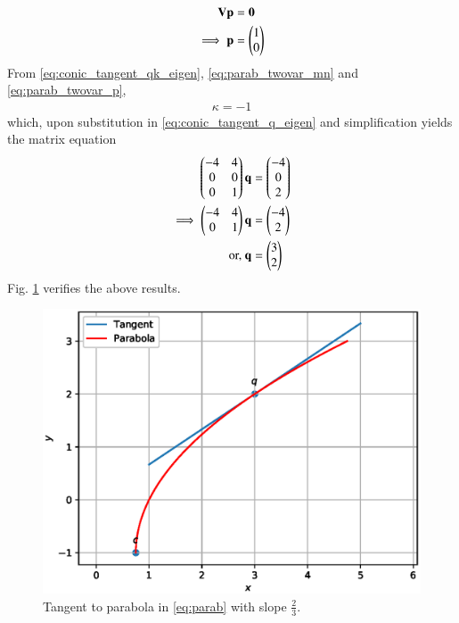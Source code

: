 \begin{enumerate}[label=\thesubsection.\arabic*.,ref=\thesubsection.\theenumi]
\begin{align}
\mathbf{V}\mathbf{p} &= \mathbf{0}
\\
\implies \mathbf{p} &= \begin{pmatrix}1\\0\end{pmatrix}
\label{eq:parab_twovar_p}
\end{align}
From \eqref{eq:conic_tangent_qk_eigen}, \eqref{eq:parab_twovar_mn} and \eqref{eq:parab_twovar_p},
\begin{align}
\kappa = -1
\end{align}
which, upon substitution in \eqref{eq:conic_tangent_q_eigen} and simplification yields the matrix equation
\begin{align}
\begin{pmatrix}-4 & 4\\0 & 0\\0&1\end{pmatrix}\mathbf{q} &= \begin{pmatrix}-4\\0\\2\end{pmatrix}
\\
\implies \begin{pmatrix}-4 & 4\\0&1\end{pmatrix}\mathbf{q} &= \begin{pmatrix}-4\\2\end{pmatrix}
\\
\text{or, } \mathbf{q} &= \begin{pmatrix}3\\2\end{pmatrix}
\end{align}
Fig. \ref{fig:parab_tangent}	verifies the above results.
%
\begin{figure}[!ht]
\centering
\includegraphics[width=\columnwidth]{./figs/parab/parab_tangent.eps}
\caption{Tangent to  parabola in \eqref{eq:parab}  with slope $\frac{2}{3}$. }
\label{fig:parab_tangent}	
\end{figure}


\end{enumerate}
